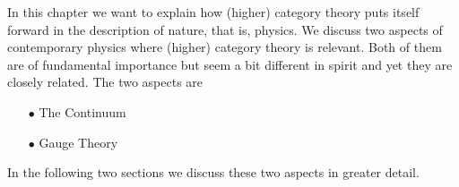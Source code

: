 In this chapter we want to explain how (higher) category theory puts itself forward in the description of nature, that is, physics. We discuss two aspects of contemporary physics where (higher) category theory is relevant. Both of them are of fundamental importance but seem a bit different in spirit and yet they are closely related. The two aspects are
\begin{enumerate}
\item[$\bullet$]
The Continuum
\item[$\bullet$]
Gauge Theory
\end{enumerate}
In the following two sections we discuss these two aspects in greater detail.
